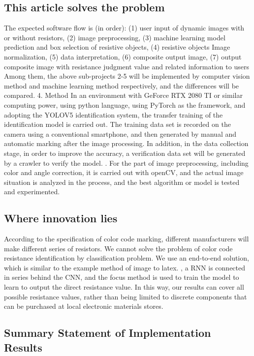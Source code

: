 \documentclass{article}
\begin{document}
\subsection{This article solves the problem}
The expected software flow is (in order): (1) user input of dynamic images with or without resistors, (2) image preprocessing, (3) machine learning model prediction and box selection of resistive objects, (4) resistive objects Image normalization, (5) data interpretation, (6) composite output image, (7) output composite image with resistance judgment value and related information to users
Among them, the above sub-projects 2-5 will be implemented by computer vision method and machine learning method respectively, and the differences will be compared.
4. Method
In an environment with GeForce RTX 2080 TI or similar computing power, using python language, using PyTorch as the framework, and adopting the YOLOV5 identification system, the transfer training of the identification model is carried out. The training data set is recorded on the camera using a conventional smartphone, and then generated by manual and automatic marking after the image processing. In addition, in the data collection stage, in order to improve the accuracy, a verification data set will be generated by a crawler to verify the model. .
For the part of image preprocessing, including color and angle correction, it is carried out with openCV, and the actual image situation is analyzed in the process, and the best algorithm or model is tested and experimented.

\subsection{Where innovation lies}
According to the specification of color code marking, different manufacturers will make different series of resistors. We cannot solve the problem of color code resistance identification by classification problem. We use an end-to-end solution, which is similar to the example method of image to latex. , a RNN is connected in series behind the CNN, and the focus method is used to train the model to learn to output the direct resistance value. In this way, our results can cover all possible resistance values, rather than being limited to discrete components that can be purchased at local electronic materials stores.

\subsection{Summary Statement of Implementation Results}
\end{document}
